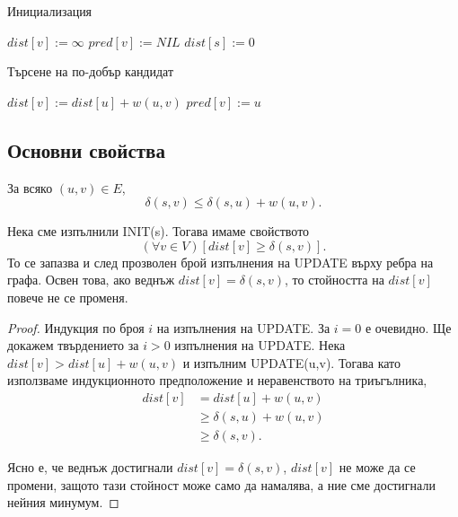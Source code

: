 \begin{algorithm}[h!]
  \caption{Инициализация}
  \label{alg:init}
  \begin{algorithmic}[1]
    \State $dist[v] := \infty$
    \State $pred[v] := NIL$
    \EndFor
    \State $dist[s] := 0$
    \EndProcedure
  \end{algorithmic}
\end{algorithm}

\begin{algorithm}[h!]
  \caption{Търсене на по-добър кандидат}
  \label{alg:update}
  \begin{algorithmic}[1]
    \State $dist[v] := dist[u] + w(u,v)$
    \State $pred[v] := u$
    \EndIf
    \EndProcedure
  \end{algorithmic}
\end{algorithm}

\subsection{Основни свойства}
  
\begin{prop}
  \label{prop:triangle}
  За всяко $(u,v) \in E$,
  \[\delta(s,v) \leq \delta(s,u) + w(u,v).\]
\end{prop}

\begin{prop}
  \label{prop:upper-bound}
  Нека сме изпълнили INIT(s).
  Тогава имаме свойството \[(\forall v\in V)[dist[v] \geq \delta(s,v)].\]
  То се запазва и след прозволен брой изпълнения на UPDATE върху ребра на графа.
  Освен това, ако веднъж $dist[v] = \delta(s,v)$, то стойността на $dist[v]$
  повече не се променя.
\end{prop}
\begin{proof}
  Индукция по броя $i$ на изпълнения на UPDATE.
  За $i = 0$ е очевидно.
  Ще докажем твърдението за $i > 0$ изпълнения на UPDATE.
  Нека $dist[v] > dist[u] + w(u,v)$ и изпълним UPDATE(u,v).
  Тогава като използваме индукционното предположение и неравенството на триъгълника,
  \begin{align*}
    dist[v] & = dist[u] + w(u,v)\\
    & \geq \delta(s,u) + w(u,v)\\
    & \geq  \delta(s,v).
  \end{align*}

  Ясно е, че веднъж достигнали $dist[v] = \delta(s,v)$, $dist[v]$
  не може да се промени, защото тази стойност може само да намалява, а ние
  сме достигнали нейния минумум.
\end{proof}

